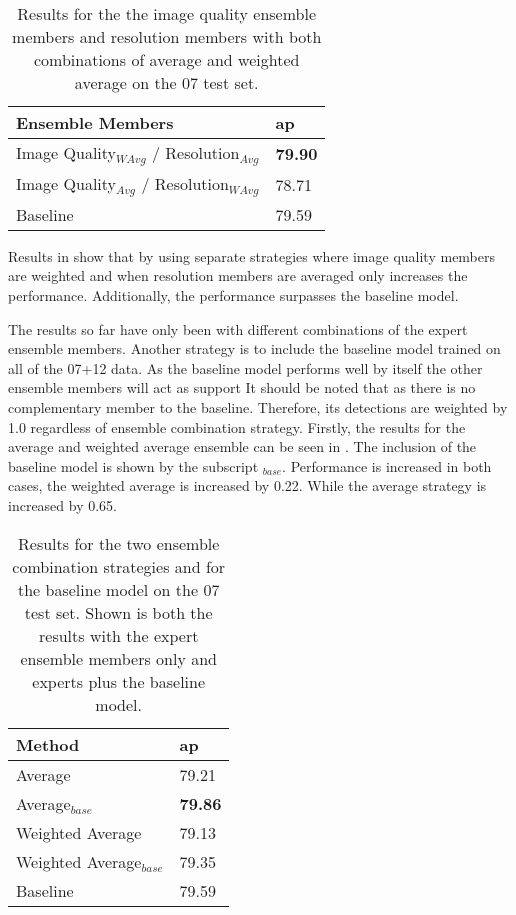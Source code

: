\documentclass[a4paper,twoside]{article}
\begin{document}
\begin{table}[h]
\centering
\caption{Results for the the image quality ensemble members and resolution members with both combinations of average and weighted average on the 07 test set.}
\label{tab:weandavgres}
\begin{tabular}{|l|l|}
\hline
\textbf{Ensemble Members}                  & \textbf{\gls{ap}} \\ \hline
Image Quality$_{WAvg}$ / Resolution$_{Avg}$ & \textbf{79.90} \\ \hline
Image Quality$_{Avg}$ / Resolution$_{WAvg}$ & 78.71 \\ \hline
Baseline                          & 79.59 \\ \hline
\end{tabular}
\end{table}

Results in  show that by using separate strategies where image quality members are weighted and when resolution members are averaged only increases the performance. Additionally, the performance surpasses the baseline model. 

The results so far have only been with different combinations of the expert ensemble members. Another strategy is to include the baseline model trained on all of the 07+12 data. As the baseline model performs well by itself the other ensemble members will act as support It should be noted that as there is no complementary member to the baseline. Therefore, its detections are weighted by 1.0 regardless of ensemble combination strategy. Firstly, the results for the average and weighted average ensemble can be seen in . The inclusion of the baseline model is shown by the subscript $_{base}$. Performance is increased in both cases, the weighted average is increased by 0.22. While the average strategy is increased by 0.65.

\begin{table}[h]
\centering
\caption{Results for the two ensemble combination strategies and for the baseline model on the 07 test set. Shown is both the results with the expert ensemble members only and experts plus the baseline model.}
\label{tab:ensemble_base}
\begin{tabular}{|l|l|}
\hline
\textbf{Method}           & \textbf{\gls{ap}} \\ \hline
Average          & 79.21 \\ \hline
Average$_{base}$          & \textbf{79.86} \\ \hline
Weighted Average & 79.13 \\ \hline
Weighted Average$_{base}$ & 79.35 \\ \hline
Baseline         & 79.59 \\ \hline
\end{tabular}
\end{table}
\end{document}
